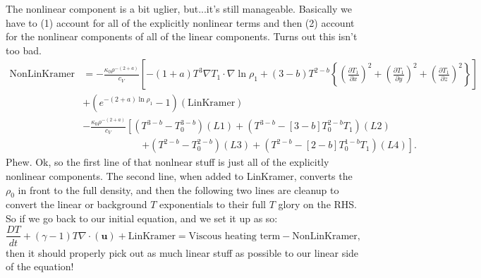 \documentclass[aps, pre, onecolumn, nofootinbib, notitlepage, groupedaddress, amsfonts, amssymb, amsmath, longbibliography]{revtex4-1}
\newcommand{\Div}[1]{\ensuremath{\nabla\cdot\left( #1\right)}}
\newcommand{\grad}{\ensuremath{\nabla}}
\begin{document}
The nonlinear component is a bit uglier, but...it's still manageable. Basically we
have to (1) account for all of the explicitly nonlinear terms and then (2) account
for the nonlinear components of all of the linear components. Turns out this isn't
too bad.
\begin{equation}
\begin{split}
\text{NonLinKramer} &= -\frac{\kappa_0 \rho^{-(2+a)}}{c_V}\left[
-(1+a)T^3 \grad T_1\cdot\grad\ln\rho_1 + (3-b)T^{2-b}\left\{
\left(\frac{\partial T_1}{\partial x}\right)^2
+\left(\frac{\partial T_1}{\partial y}\right)^2
+\left(\frac{\partial T_1}{\partial z}\right)^2
\right\}\right]\\
&+ \left(e^{-(2+a)\ln\rho_1} - 1\right)(\text{LinKramer}) \\
&- \frac{\kappa_0 \rho^{-(2+a)}}{c_V}\left[
(T^{3-b} - T_0^{3-b})(L1) + (T^{3-b} - [3-b]T_0^{2-b}T_1)(L2)\right.\\
&\qquad\qquad\qquad\left.
+ (T^{2-b} - T_0^{2-b})(L3) + (T^{2-b} - [2-b]T_0^{1-b}T_1)(L4)
\right].
\end{split}
\end{equation}
Phew. Ok, so the first line of that nonlnear stuff is just all of the explicitly
nonlinear components. The second line, when added to LinKramer, converts the
$\rho_0$ in front to the full density, and then the following two lines are cleanup
to convert the linear or background $T$ exponentials to their full $T$ glory on
the RHS.  So if we go back to our initial equation, and we set it up as so:
\begin{equation}
\frac{D T}{d t} + (\gamma-1)T\Div{\bm{u}} 
 + \text{LinKramer} = \text{Viscous heating term} - \text{NonLinKramer},
\end{equation}
then it should properly pick out as much linear stuff as possible to our linear
side of the equation!



\end{document}
